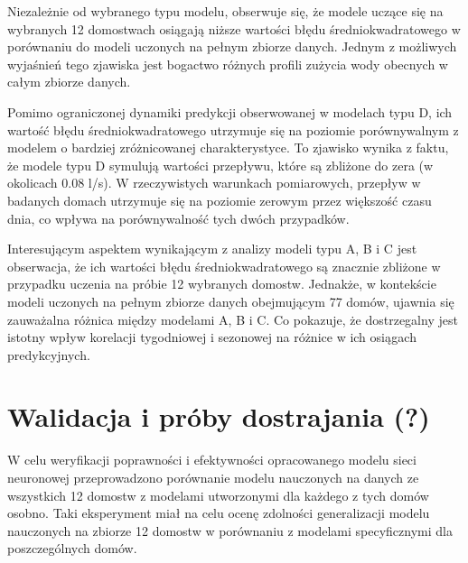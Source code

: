 \documentclass[a4paper,twoside,12pt]{book}
\begin{document}
Niezależnie od wybranego typu modelu, obserwuje się, że modele uczące się na wybranych 12 domostwach osiągają niższe wartości błędu średniokwadratowego w porównaniu do modeli uczonych na pełnym zbiorze danych. Jednym z możliwych wyjaśnień tego zjawiska jest bogactwo różnych profili zużycia wody obecnych w całym zbiorze danych.

Pomimo ograniczonej dynamiki predykcji obserwowanej w modelach typu D, ich wartość błędu średniokwadratowego utrzymuje się na poziomie porównywalnym z modelem o bardziej zróżnicowanej charakterystyce. To zjawisko wynika z faktu, że modele typu D symulują wartości przepływu, które są zbliżone do zera (w okolicach 0.08 l/s). W rzeczywistych warunkach pomiarowych, przepływ w badanych domach utrzymuje się na poziomie zerowym przez większość czasu dnia, co wpływa na porównywalność tych dwóch przypadków.

Interesującym aspektem wynikającym z analizy modeli typu A, B i C jest obserwacja, że ich wartości błędu średniokwadratowego są znacznie zbliżone w przypadku uczenia na próbie 12 wybranych domostw. Jednakże, w kontekście modeli uczonych na pełnym zbiorze danych obejmującym 77 domów, ujawnia się zauważalna różnica między modelami A, B i C. Co pokazuje, że dostrzegalny jest istotny wpływ korelacji tygodniowej i sezonowej na różnice w ich osiągach predykcyjnych.
\newpage
\section{Walidacja i próby dostrajania (?)}
W celu weryfikacji poprawności i efektywności opracowanego modelu sieci neuronowej przeprowadzono porównanie modelu nauczonych na danych ze wszystkich 12 domostw z modelami utworzonymi dla każdego z tych domów osobno. Taki eksperyment miał na celu ocenę zdolności generalizacji modelu nauczonych na zbiorze 12 domostw w porównaniu z modelami specyficznymi dla poszczególnych domów.
\end{document}
